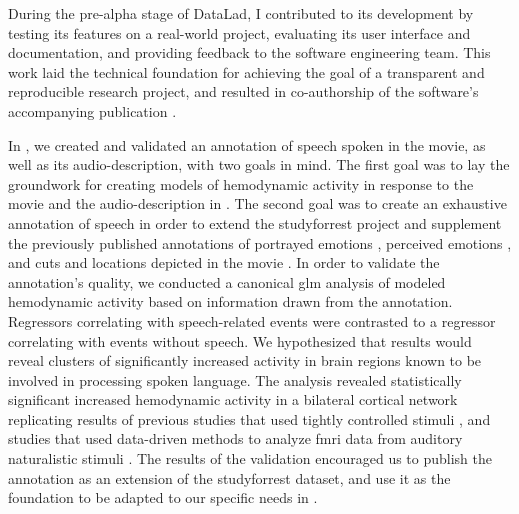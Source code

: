 


During the pre-alpha stage of DataLad, I contributed to its development by
testing its features on a real-world project, evaluating its user interface and
documentation, and providing feedback to the software engineering team.
This work laid the technical foundation for achieving the goal of a transparent
and reproducible research project, and resulted in co-authorship of the
software's accompanying publication \citep[s.][]{halchenko2021datalad}.



In \citet{haeusler2021speechanno}, we created and validated an annotation of
speech spoken in the movie, as well as its audio-description, with two goals in
mind.
The first goal was to lay the groundwork for creating models of hemodynamic
activity in response to the movie and the audio-description in
\citet{haeusler2022processing}.
The second goal was to create an exhaustive annotation of speech in order to
extend the studyforrest project and supplement the previously published
annotations of portrayed emotions \citep{labs2015portrayed}, perceived emotions
\citep{lettieri2019emotionotopy}, and cuts and locations depicted in the movie
\citep{haeusler2016cutanno}.
In order to validate the annotation's quality, we conducted a canonical \ac{glm}
analysis of modeled hemodynamic activity based on information drawn from the
annotation.
Regressors correlating with speech-related events were contrasted to a regressor
correlating with events without speech.
We hypothesized that results would reveal clusters of significantly increased
activity in brain regions known to be involved in processing spoken language.
The analysis revealed statistically significant increased hemodynamic activity
in a bilateral cortical network replicating results of previous studies that
used tightly controlled stimuli \citep[s.][for reviews]{friederici2011brain,
hickok2007cortical,price2012twentyyears}, and studies that used data-driven
methods to analyze \ac{fmri} data from auditory naturalistic stimuli
\citep{honey2012not, lerner2011topographic, silbert2014coupled}.
The results of the validation encouraged us to publish the annotation as an
extension of the studyforrest dataset, and use it as the foundation to be
adapted to our specific needs in \citet{haeusler2022processing}.


